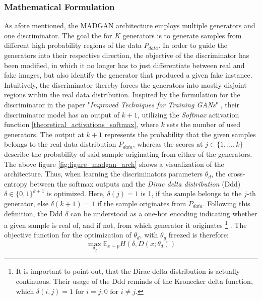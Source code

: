 \subsubsection{Mathematical Formulation}
\label{theoretical_madgan_math}
As afore mentioned, the MADGAN architecture employs multiple generators and one discriminator. The goal the for \(K\) generators is to generate samples from different high probability regions of the data \(P_{data}\). In order to guide the generators into their respective direction, the objective of the discriminator has been modified, in which it no longer has to just differentiate between real and fake images, but also identify the generator that produced a given fake instance. Intuitively, the discriminator thereby forces the generators into mostly disjoint regions within the real data distribution. Inspired by the formulation for the discriminator in the paper "\textit{Improved Techniques for Training GANs}" \cite{salimans2016improvedtechniquestraininggans}, their discriminator model has an output of \(k+1\), utilizing the \textit{Softmax} activation function \ref{theoretical_activations_softmax}, where \(k\) sets the number of used generators. The output at \(k+1\) represents the probability that the given samples belongs to the real data distribution \(P_{data}\), whereas the scores at \(j \in \{ 1, ..., k \}\) describe the probability of said sample originating from either of the generators. The above figure \ref{fig:figure_madgan_arch} shows a visualization of the architecture. Thus, when learning the discriminators parameters \(\theta_d\), the cross-entropy between the softmax outputs and the \textit{Dirac delta distribution} (Ddd) \(\delta \in \{0, 1\}^{k+1}\) is optimized. Here, \(\delta(j) = 1\) is 1, if the sample belongs to the \(j\)-th generator, else \(\delta(k+1) = 1\) if the sample originates from \(P_{data}\). Following this definition, the Ddd \(\delta\) can be understood as a one-hot encoding indicating whether a given sample is real of, and if not, from which generator it originates
\footnote{It is important to point out, that the Dirac delta distribution is actually continuous. Their usage of the Ddd reminds of the Kronecker delta function, which \( \delta(i,j) = 1 \text{ for } i=j; 0 \text{ for } i \ne j \).}
. The objective function for the optimization of \(\theta_d\), with \(\theta_g\) freezed is therefore:
\begin{equation}
    \max\limits_{\theta_d}\mathbb{E}_{x \sim p} H(\delta, D(x; \theta_d))
\end{equation}

